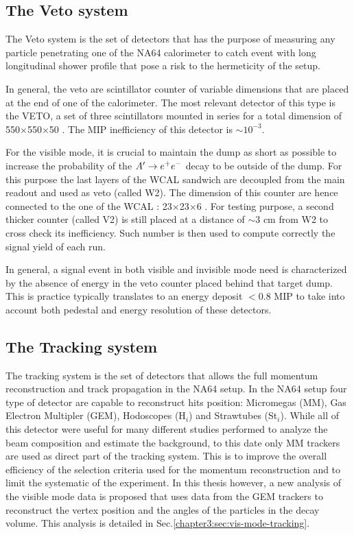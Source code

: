 \subsection{The Veto system}
\label{chapter2:sec:detectors-veto}

The Veto system is the set of detectors that has the purpose of measuring any particle penetrating one of the NA64 calorimeter to catch event with long longitudinal shower profile that pose a risk to the hermeticity of the setup.

In general, the veto are scintillator counter of variable dimensions that are placed at the end of one of the calorimeter. The most relevant detector of this type is the VETO, a set of three scintillators mounted in series for a total dimension of 550$\times$550$\times$50 \mmc. The MIP inefficiency of this detector is $\sim 10^{-3}$.

For the visible mode, it is crucial to maintain the dump as short as possible to increase the probability of the $A' \to e^+e^-$ decay to be outside of the dump. For this purpose the last layers of the WCAL sandwich are decoupled from the main readout and used as veto (called W2). The dimension of this counter are hence connected to the one of the WCAL : 23$\times$23$\times$6 \mmc. For testing purpose, a second thicker counter (called V2) is still placed at a distance of $\sim3$ \si{cm} from W2 to cross check its inefficiency. Such number is then used to compute correctly the signal yield of each run.

In general, a signal event in both visible and invisible mode need is characterized by the absence of energy in the veto counter placed behind that target dump. This is practice typically translates to an energy deposit $<$0.8 MIP to take into account both pedestal and energy resolution of these detectors.

\subsection{The Tracking system}
\label{chapter2:sec:detectors-tracking}

The tracking system is the set of detectors that allows the full momentum reconstruction and track propagation in the NA64 setup. In the NA64 setup four type of detector are capable to reconstruct hits position: Micromegas (MM), Gas Electron Multipler (GEM), Hodoscopes (H$_i$) and Strawtubes (St$_i$). While all of this detector were useful for many different studies performed to analyze the beam composition and estimate the background, to this date only MM trackers are used as direct part of the tracking system. This is to improve the overall efficiency of the selection criteria used for the momentum reconstruction and to limit the systematic of the experiment. In this thesis however, a new analysis of the visible mode data is proposed that uses data from the GEM trackers to reconstruct the vertex position and the angles of the particles in the decay volume. This analysis is detailed in Sec.\ref{chapter3:sec:vis-mode-tracking}.

